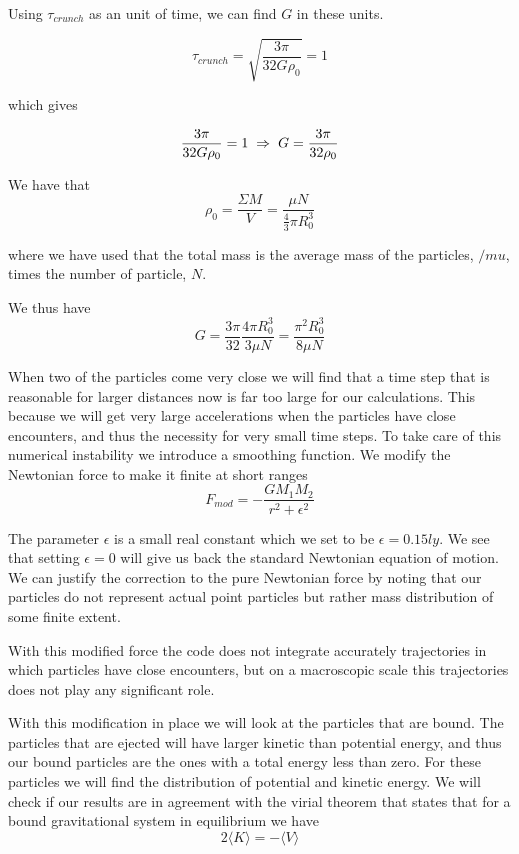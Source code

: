 \documentclass[a4paper,12pt, english]{article}
\begin{document}
Using $\tau_{crunch}$ as an unit of time, we can find $G$ in these units. 

\[
\tau_{crunch} = \sqrt{\frac{3 \pi}{32 G \rho_0}} = 1
\]

which gives 

\[
\frac{3 \pi}{32G \rho_0} = 1 \hspace{1mm} \Rightarrow \hspace{1mm} G = \frac{3 \pi}{32 \rho_0}
\]

We have that 
\[
\rho_0 = \frac{\Sigma M}{V} = \frac{\mu N}{ \frac{4}{3} \pi R_0^3} 
\]

where we have used that the total mass is the average mass of the particles, $/mu$, times the number of particle, $N$. 

We thus have
\[
G = \frac{3 \pi}{32} \frac{4 \pi R_0^3}{3 \mu N} = \frac{\pi^2 R_0^ 3}{8 \mu N}
\]


When two of the particles come very close we will find that a time step that is reasonable for larger distances now is far too large for our calculations. This because we will get very large accelerations when the particles have close encounters, and thus the necessity for very small time steps. To take care of this numerical instability we introduce a smoothing function. We modify the Newtonian force to make it finite at short ranges
\[
F_{mod} = - \frac{GM_1M_2}{r^2 + \epsilon^2}
\]

The parameter $\epsilon$ is a small real constant which we set to be $\epsilon = 0.15 ly$. We see that setting $\epsilon = 0$ will give us back the standard Newtonian equation of motion. We can justify the correction to the pure Newtonian force by noting that our particles do not represent actual point particles but rather mass distribution of some finite extent. 

With this modified force the code does not integrate accurately trajectories in which particles have close encounters, but on a macroscopic scale this trajectories does not play any significant role.   


With this modification in place we will look at the particles that are bound. The particles that are ejected will have larger kinetic than potential energy, and thus our bound particles are the ones with a total energy less than zero. For these particles we will find the distribution of potential and kinetic energy. We will check if our results are in agreement with the virial theorem that states that for a bound gravitational system in equilibrium we have 
\[
2\langle K\rangle = -\langle V \rangle
\]
\end{document}
